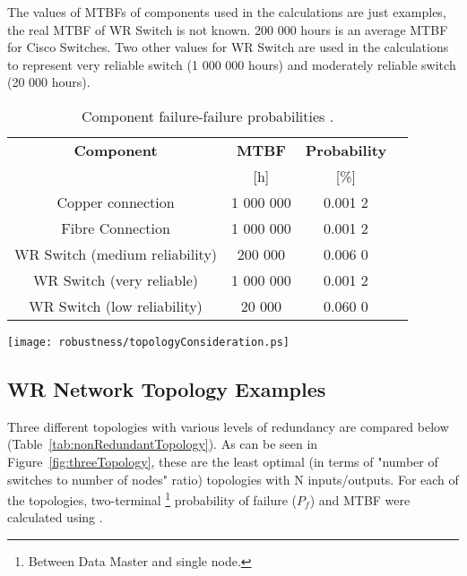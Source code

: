 The values of MTBFs of components used in the calculations are just examples,
the real MTBF of WR Switch is not known. 200 000 hours is an average MTBF for
Cisco Switches. Two other values for WR Switch are used in the calculations to
represent very reliable switch (1 000 000 hours) and moderately reliable switch
(20 000 hours). 
\begin{table}[ht]
\caption{Component failure-failure probabilities \cite{The All-New Switch Book:
The Complete Guide to LAN Switching Technology}. }
\centering
\begin{tabular}{|c|c|c|c|}          \hline
\textbf{Component}& \textbf{MTBF} & \textbf{Probability} \\
                  &    [h]       &        [\%]   \\ \hline
Copper connection &   1 000 000   &   0.001 2  \\ \hline
Fibre Connection  &   1 000 000   &   0.001 2  \\ \hline
WR Switch (medium reliability)&     200 000   &   0.006 0  \\ \hline
WR Switch (very reliable)     &   1 000 000   &   0.001 2  \\ \hline
WR Switch (low reliability)   &      20 000   &   0.060 0 \\ \hline

\end{tabular}
\label{tab:MTBFandProbabilityOfComponents}
\end{table}


\begin{center}
	\texttt{[image: robustness/topologyConsideration.ps]}
	\label{fig:topologyConsideration}
\end{center}

\subsection{WR Network Topology Examples}
\label{WRnetworkTopologyExamples}
Three different topologies with various levels of redundancy are compared
below (Table~\ref{tab:nonRedundantTopology}). As can be seen in
Figure~\ref{fig:threeTopology}, these are the least
optimal (in terms of "number of switches to number of nodes" ratio) topologies
with N inputs/outputs. For each of the topologies, two-terminal
\footnote{Between Data Master and single node.} probability of failure ($P_f$)
and MTBF were calculated using \cite{FaultTree}. 

